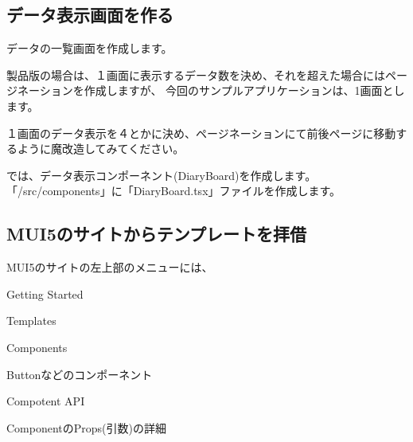 \subsection{データ表示画面を作る}
\keeplastskip{
  \label{sec:3-3-2}
  \label{sec-0330UI}
  \par\nobreak
}

データの一覧画面を作成します。

\vspace*{\baselineskip}

製品版の場合は、１画面に表示するデータ数を決め、それを超えた場合にはページネーションを作成しますが、
今回のサンプルアプリケーションは、1画面とします。

\vspace*{\baselineskip}

１画面のデータ表示を４とかに決め、ページネーションにて前後ページに移動するように魔改造してみてください。

\vspace*{\baselineskip}

では、データ表示コンポーネント(DiaryBoard)を作成します。
「/src/components」に「DiaryBoard.tsx」ファイルを作成します。

\subsection{MUI5のサイトからテンプレートを拝借}
\keeplastskip{
  \label{sec:3-3-3}
  \label{sec-0331}
  \par\nobreak
}

MUI5のサイトの左上部のメニューには、

\begin{starteritemize}
\item Getting Started

\begin{starteritemize}
\item Templates
\end{starteritemize}

\item Components

\begin{starteritemize}
\item Buttonなどのコンポーネント
\end{starteritemize}

\item Compotent API

\begin{starteritemize}
\item ComponentのProps(引数)の詳細
\end{starteritemize}

\end{starteritemize}


